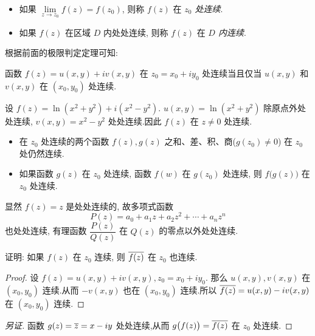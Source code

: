 \begin{definition}[连续]
  \begin{itemize}
    \item 如果 $\lim\limits_{z\to z_0}f(z)=f(z_0)$, 则称 $f(z)$ 在 \emph{$z_0$ 处连续}.
    \item 如果 $f(z)$ 在区域 $D$ 内处处连续, 则称 $f(z)$ 在 \emph{$D$ 内连续}.
  \end{itemize}
\end{definition}

根据前面的极限判定定理可知:
\begin{theorem}[连续的等价刻画]
  函数 $f(z)=u(x,y)+iv(x,y)$ 在 $z_0=x_0+iy_0$ 处连续当且仅当 $u(x,y)$ 和 $v(x,y)$ 在 $(x_0,y_0)$ 处连续.
\end{theorem}

\begin{example}
  设 $f(z)=\ln(x^2+y^2)+i(x^2-y^2)$.
  $u(x,y)=\ln(x^2+y^2)$ 除原点外处处连续, $v(x,y)=x^2-y^2$ 处处连续.因此 $f(z)$ 在 $z\neq0$ 处连续.
\end{example}

\begin{theorem}[连续函数的四则运算和复合]
  \begin{itemize}
    \item 在 $z_0$ 处连续的两个函数 $f(z),g(z)$ 之和、差、积、商($g(z_0)\neq 0$) 在 $z_0$ 处仍然连续.
    \item 如果函数 $g(z)$ 在 $z_0$ 处连续, 函数 $f(w)$ 在 $g(z_0)$ 处连续, 则 $f\bigl(g(z)\bigr)$ 在 $z_0$ 处连续.
  \end{itemize}
\end{theorem}

显然 $f(z)=z$ 是处处连续的, 故多项式函数
\[P(z)=a_0+a_1z+a_2z^2+\cdots+a_nz^n\]
也处处连续, 有理函数 $\dfrac{P(z)}{Q(z)}$ 在 $Q(z)$ 的零点以外处处连续.

\begin{example}
  证明: 如果 $f(z)$ 在 $z_0$ 连续, 则 $\overline{f(z)}$ 在 $z_0$ 也连续.
\end{example}

\begin{proof}
  设 $f(z)=u(x,y)+iv(x,y),z_0=x_0+iy_0$.
  那么 $u(x,y),v(x,y)$ 在 $(x_0,y_0)$ 连续.从而 $-v(x,y)$ 也在 $(x_0,y_0)$ 连续.所以 $\overline{f(z)}=u(x,y)-iv(x,y)$ 在 $(x_0,y_0)$ 连续.
\end{proof}
\begin{proof}[另证]
  函数 $g(z)=\overline z=x-iy$ 处处连续,从而 $g\bigl(f(z)\bigr)=\overline{f(z)}$ 在 $z_0$ 处连续.
\end{proof}

